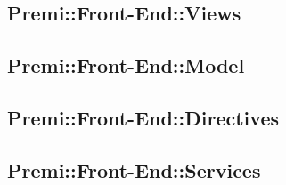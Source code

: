 		\subsection{Premi::Front-End::Views}
			
			\newpage

		\subsection{Premi::Front-End::Model}
			
			\newpage

		\subsection{Premi::Front-End::Directives}
			
			\newpage

		\subsection{Premi::Front-End::Services}
			
			\newpage

